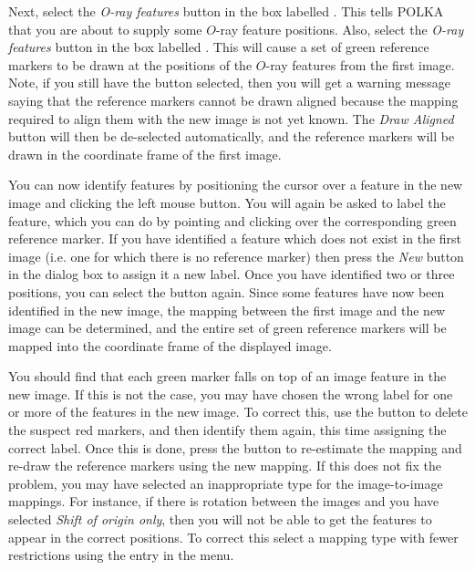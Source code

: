 Next, select the {\em O-ray features} button in the box labelled
. This tells POLKA that you are
about to supply some $O$-ray feature positions. Also, select the 
{\em O-ray features} button in the box labelled
. This will cause
a set of green reference markers to be drawn at the positions of the
$O$-ray features from the first image. Note, if you still have the
 button selected, then
you will get a warning message saying that the reference markers cannot
be drawn aligned because the mapping required to align them with the new
image is not yet known. The {\em Draw Aligned} button will then be
de-selected automatically, and the reference markers will be drawn in the
coordinate frame of the first image.

You can now identify features by positioning the cursor over a feature in
the new image and clicking the left mouse button. You will again be asked
to label the feature, which you can do by pointing and clicking over the
corresponding green reference marker. If you have identified a feature
which does not exist in the first image (i.e. one for which there is no
reference marker) then press the {\em New} button in the  dialog box to assign it a new
label. Once you have identified two or three positions, you can select
the  button again. Since
some features have now been identified in the new image, the mapping
between the first image and the new image can be determined, and the
entire set of green reference markers will be mapped into the coordinate
frame of the displayed image. 

You should find that each green marker falls on top of an image feature
in the new image. If this is not the case, you may have chosen the wrong
label for one or more of the features in the new image. To correct this,
use the  button to delete the suspect
red markers, and then identify them again, this time assigning the
correct label. Once this is done, press the  button to re-estimate the mapping and re-draw the
reference markers using the new mapping. If this does not fix the
problem, you may have selected an inappropriate type for the
image-to-image mappings. For instance, if there is rotation between the
images and you have selected {\em Shift of origin only}, then you will
not be able to get the features to appear in the correct positions. To
correct this select a mapping type with fewer restrictions using the
 entry in the  menu.

